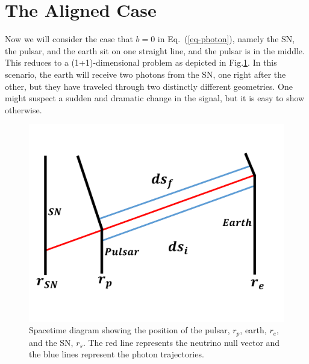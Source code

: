 \documentclass[aps,showpacs,twocolumn,floats,prd,superscriptaddress,nofootinbib]{revtex4-1}
\begin{document}
\section{The Aligned Case}
\label{sec-1+1}

Now we will consider the case that $b=0$ in Eq.~(\ref{eq-photon}), namely the SN, the pulsar, and the earth sit on one straight line, and the pulsar is in the middle. This reduces to a (1+1)-dimensional problem as depicted in Fig.\ref{fig:1}. In this scenario, the earth will receive two photons from the SN, one right after the other, but they have traveled through two distinctly different geometries. One might suspect a sudden and dramatic change in the signal, but it is easy to show otherwise.

\begin{figure}[tb!]
\begin{center}
\includegraphics[scale = 0.3]{Image2.pdf}
\caption{Spacetime diagram showing the position of the pulsar, $r_p$, earth, $r_e$, and the SN, $r_s$. The red line represents the neutrino null vector and the blue lines represent the photon trajectories.}
\label{fig:1}
\end{center}
\end{figure}
\end{document}
